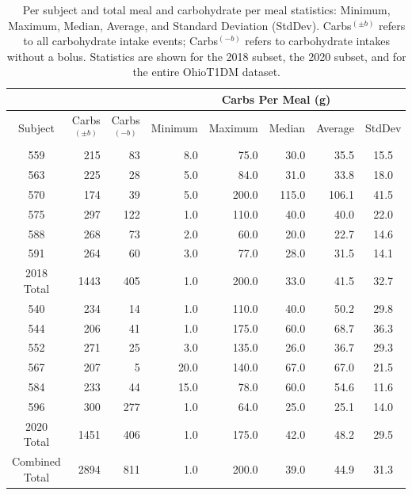 \documentclass[journal,article,submit,moreauthors,pdftex]{Definitions/mdpi}
\begin{document}
\begin{table}[t]\setlength{\tabcolsep}{4pt}
\begin{center}
\caption{Per subject and total meal and carbohydrate per meal statistics: Minimum, Maximum, Median, Average, and Standard Deviation (StdDev). Carbs$^{(\pm b)}$ refers to all carbohydrate intake events; Carbs$^{(-b)}$ refers to carbohydrate intakes without a bolus. Statistics are shown for the 2018 subset, the 2020 subset, and for the entire OhioT1DM dataset.}
\label{tab:meals}
\begin{tabular}{|crr|rrrrc|}
    \cline{4-8}
    \multicolumn{3}{c}{} & \multicolumn{5}{|c|}{Carbs Per Meal (g)}\\
	\hline
	Subject & \multicolumn{1}{c}{Carbs$^{(\pm b)}$} & \multicolumn{1}{c|}{Carbs$^{(-b)}$} & \multicolumn{1}{c}{Minimum} & \multicolumn{1}{c}{Maximum}
	& \multicolumn{1}{c}{Median} & \multicolumn{1}{c}{Average} & StdDev\\
	\hline
	559 & 215 & 83 & 8.0 & 75.0 & 30.0 & 35.5 & 15.5\\
    563 & 225 & 28 & 5.0 & 84.0 & 31.0 & 33.8 & 18.0\\
    570 & 174 & 39 & 5.0 & 200.0 & 115.0 & 106.1 & 41.5\\
	575 & 297 & 122 & 1.0 & 110.0 & 40.0 & 40.0 & 22.0\\
	588 & 268 & 73 & 2.0 & 60.0 & 20.0 & 22.7 & 14.6\\
	591 & 264 & 60 & 3.0 & 77.0 & 28.0 & 31.5 & 14.1\\
	\hline
	2018 Total & 1443 & 405 & 1.0 & 200.0 & 33.0 & 41.5 & 32.7\\
	\hline
	540 & 234 & 14 & 1.0 & 110.0 & 40.0 & 50.2 & 29.8\\
	544 & 206 & 41 & 1.0 & 175.0 & 60.0 & 68.7 & 36.3\\
	552 & 271 & 25 & 3.0 & 135.0 & 26.0 & 36.7 & 29.3\\
	567 & 207 & 5 & 20.0 & 140.0 & 67.0 & 67.0 & 21.5\\
	584 & 233 & 44 & 15.0 & 78.0 & 60.0 & 54.6 & 11.6\\
	596 & 300 & 277 & 1.0 & 64.0 & 25.0 & 25.1 & 14.0\\
	\hline
	2020 Total & 1451 & 406 & 1.0 & 175.0 & 42.0 & 48.2 & 29.5\\
	\hline
	Combined Total & 2894 & 811 & 1.0 & 200.0 & 39.0 & 44.9 & 31.3\\
	\hline
\end{tabular}
\end{center}
\end{table}
\end{document}
